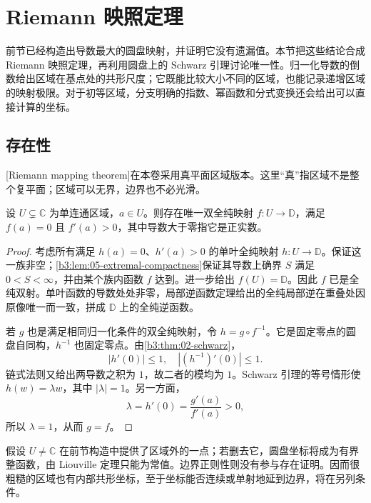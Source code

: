 \section{Riemann 映照定理}
\label{b3:sec:0503}

前节已经构造出导数最大的圆盘映射，并证明它没有遗漏值。本节把这些结论合成 Riemann 映照定理，再利用圆盘上的 Schwarz 引理讨论唯一性。归一化导数的倒数给出区域在基点处的共形尺度；它既能比较大小不同的区域，也能记录递增区域的映射极限。对于初等区域，分支明确的指数、幂函数和分式变换还会给出可以直接计算的坐标。

\subsection{存在性}
\label{b3:subsec:050301}

[Riemann mapping theorem]在本卷采用真平面区域版本。这里“真”指区域不是整个复平面；区域可以无界，边界也不必光滑。

\begin{theorem}[Riemann 映照]\label{b3:thm:05-riemann}
设 \(U\subsetneq\mathbb C\) 为单连通区域，\(a\in U\)。则存在唯一双全纯映射 \(f:U\rightarrow\mathbb D\)，满足 \(f(a)=0\) 且 \(f'(a)>0\)，其中导数大于零指它是正实数。
\end{theorem}
\begin{proof}
考虑所有满足 \(h(a)=0\)、\(h'(a)>0\) 的单叶全纯映射 \(h:U\rightarrow\mathbb D\)。保证这一族非空；\cref{b3:lem:05-extremal-compactness}保证其导数上确界 \(S\) 满足 \(0<S<\infty\)，并由某个族内函数 \(f\) 达到。进一步给出 \(f(U)=\mathbb D\)。因此 \(f\) 已是全纯双射。单叶函数的导数处处非零，局部逆函数定理给出的全纯局部逆在重叠处因原像唯一而一致，拼成 \(\mathbb D\) 上的全纯逆函数。

若 \(g\) 也是满足相同归一化条件的双全纯映射，令 \(h=g\circ f^{-1}\)。它是固定零点的圆盘自同构，\(h^{-1}\) 也固定零点。由\cref{b3:thm:02-schwarz}，
\[
 |h'(0)|\le1,\quad |(h^{-1})'(0)|\le1.
\]
链式法则又给出两导数之积为 \(1\)，故二者的模均为 \(1\)。Schwarz 引理的等号情形使 \(h(w)=\lambda w\)，其中 \(|\lambda|=1\)。另一方面，
\[
 \lambda=h'(0)=\frac{g'(a)}{f'(a)}>0,
\]
所以 \(\lambda=1\)，从而 \(g=f\)。
\end{proof}

假设 \(U\ne\mathbb C\) 在前节构造中提供了区域外的一点；若删去它，圆盘坐标将成为有界整函数，由 Liouville 定理只能为常值。边界正则性则没有参与存在证明。因而很粗糙的区域也有内部共形坐标，至于坐标能否连续或单射地延到边界，将在另列条件。

